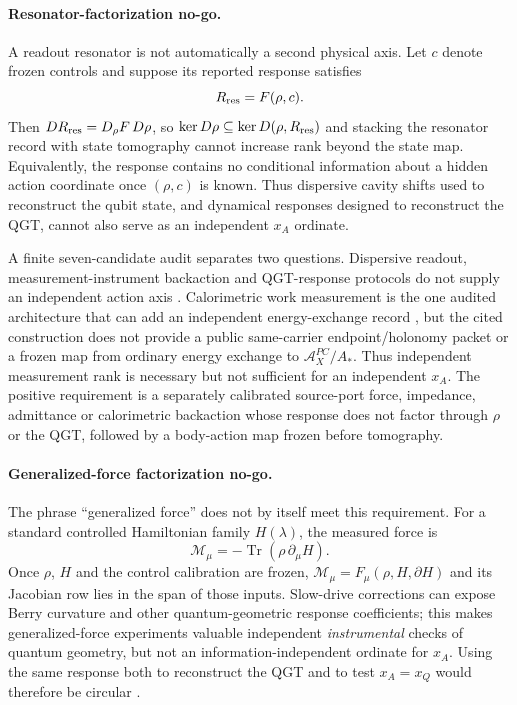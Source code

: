 \paragraph{Resonator-factorization no-go.}
A readout resonator is not automatically a second physical axis. Let $c$
denote frozen controls and suppose its reported response satisfies
\begin{equation}
 R_{\rm res}=F(\rho,c).
 \label{eq:resonator-factorization}
\end{equation}
Then $D R_{\rm res}=D_\rho F\,D\rho$, so
$\ker D\rho\subseteq\ker D(\rho,R_{\rm res})$ and stacking the resonator
record with state tomography cannot increase rank beyond the state map.
Equivalently, the response contains no conditional information about a hidden
action coordinate once $(\rho,c)$ is known. Thus dispersive cavity shifts used
to reconstruct the qubit state, and dynamical responses designed to reconstruct
the QGT, cannot also serve as an independent $x_A$ ordinate.

A finite seven-candidate audit separates two questions. Dispersive readout,
measurement-instrument backaction and QGT-response protocols do not supply an
independent action axis
\citep{Filipp2009DispersiveReadout,Hatridge2013Backaction,Rudinger2021QILGST,
Tan2019QGT,Yu2019QGT,Zhao2020GeometricGate}. Calorimetric work measurement is
the one audited architecture that can add an independent energy-exchange
record \citep{Pekola2013Calorimetry}, but the cited construction does not
provide a public same-carrier endpoint/holonomy packet or a frozen map from
ordinary energy exchange to $\mathcal A_X^{PC}/A_*$. Thus independent
measurement rank is necessary but not sufficient for an independent $x_A$.
The positive requirement is a separately calibrated source-port force,
impedance, admittance or calorimetric backaction whose response does not factor
through $\rho$ or the QGT, followed by a body-action map frozen before
tomography.

\paragraph{Generalized-force factorization no-go.}
The phrase ``generalized force'' does not by itself meet this requirement. For
a standard controlled Hamiltonian family $H(\lambda)$, the measured force is
\begin{equation}
 \mathcal M_\mu=-\operatorname{Tr}\!\left(\rho\,\partial_\mu H\right).
 \label{eq:standard-generalized-force}
\end{equation}
Once $\rho$, $H$ and the control calibration are frozen,
$\mathcal M_\mu=F_\mu(\rho,H,\partial H)$ and its Jacobian row lies in the span
of those inputs.  Slow-drive corrections can expose Berry curvature and other
quantum-geometric response coefficients; this makes generalized-force
experiments valuable independent \emph{instrumental} checks of quantum
geometry, but not an information-independent ordinate for $x_A$.  Using the
same response both to reconstruct the QGT and to test $x_A=x_Q$ would therefore
be circular \citep{Kolodrubetz2017Geometry,Schroer2014TopologicalTransition}.

